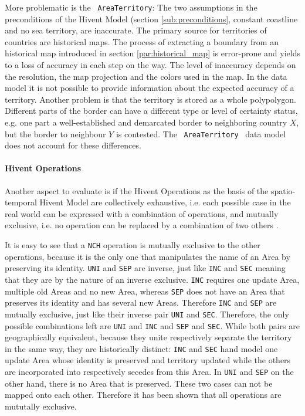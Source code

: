 More problematic is the ~\texttt{AreaTerritory}: The two assumptions in the preconditions of the Hivent Model (section \ref{sub:preconditions}, constant coastline and no sea territory, are inaccurate. The primary source for territories of countries are historical maps. The process of extracting a boundary from an historical map introduced in section \ref{par:historical_map} is error-prone and yields to a loss of accuracy in each step on the way. The level of inaccuracy depends on the resolution, the map projection and the colors used in the map. In the data model it is not possible to provide information about the expected accuracy of a territory. Another problem is that the territory is stored as a whole polypolygon. Different parts of the border can have a different type or level of certainty status, e.g. one part a well-established and demarcated border to neighboring country $X$, but the border to neighbour $Y$ is contested. The ~\texttt{AreaTerritory}~ data model does not account for these differences.


\paragraph{Hivent Operations} %
\label{par:hivent_operations}

Another aspect to evaluate is if the Hivent Operations as the basis of the spatio-temporal Hivent Model are collectively exhaustive, i.e. each possible case in the real world can be expressed with a combination of operations, and mutually exclusive, i.e. no operation can be replaced by a combination of two others \cite{mece}.

It is easy to see that a \texttt{NCH} operation is mutually exclusive to the other operations, because it is the only one that manipulates the name of an Area by preserving its identity. \texttt{UNI} and \texttt{SEP} are inverse, just like \texttt{INC} and \texttt{SEC} meaning that they are by the nature of an inverse exclusive. \texttt{INC} requires one update Area, multiple old Areas and no new Area, whereas \texttt{SEP} does not have an Area that preserves its identity and has several new Areas. Therefore \texttt{INC} and \texttt{SEP} are mutually exclusive, just like their inverse pair \texttt{UNI} and \texttt{SEC}.
Therefore, the only possible combinations left are \texttt{UNI} and \texttt{INC} and \texttt{SEP} and \texttt{SEC}. While both pairs are geographically equivalent, because they unite respectively separate the territory in the same way, they are historically distinct: \texttt{INC} and \texttt{SEC} hand model one update Area whose identity is preserved and territory updated while the others are incorporated into respectively secedes from this Area. In \texttt{UNI} and \texttt{SEP} on the other hand, there is no Area that is preserved. These two cases can not be mapped onto each other. Therefore it has been shown that all operations are mututally exclusive.

